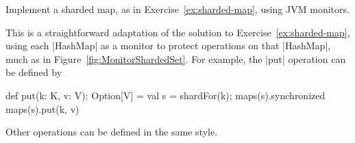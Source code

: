 \begin{questionS}
Implement a sharded map, as in Exercise~\ref{ex:sharded-map}, using JVM
monitors. 
\end{questionS}


\begin{answerS}
This is a straightforward adaptation of the solution to
Exercise~\ref{ex:sharded-map}, using each |HashMap| as a monitor to protect
operations on that |HashMap|, much as in Figure~\ref{fig:MonitorShardedSet}.
For example, the |put| operation can be defined by
\begin{scala}
  def put(k: K, v: V): Option[V] = {
    val s = shardFor(k); maps(s).synchronized{ maps(s).put(k, v) }
  }
\end{scala}
%
Other operations can be defined in the same style. 
\end{answerS}
